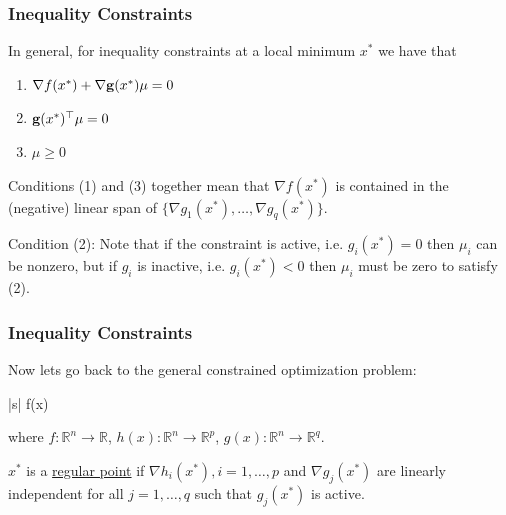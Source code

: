 \documentclass{beamer}
\begin{document}
\begin{frame}\frametitle{Inequality Constraints}
	In general, for inequality constraints at a local minimum $x^{\ast}$ we have that
	\begin{enumerate}
	\item $\nabla f(x^{\ast}) + \nabla \mathbf{g}(x^{\ast})\mu = 0$
	\item $\mathbf{g}(x^{\ast})^\top  \mu = 0$
	\item $\mu \geq 0$
	\end{enumerate}
	
	\vfill

	Conditions (1) and (3) together mean that $\nabla f(x^{\ast})$ is contained in the (negative) linear span of $\{\nabla g_1(x^{\ast}),\ldots,\nabla g_{q}(x^{\ast}) \}$.
	
	\vfill
	
	Condition (2): Note that if the constraint is active, i.e. $g_i(x^{\ast}) = 0$ then $\mu_i$ can be nonzero, but if $g_i$ is inactive, i.e. $g_i(x^{\ast}) < 0$ then $\mu_i$ must be zero to satisfy (2).		
\end{frame}

\begin{frame}\frametitle{Inequality Constraints}
	Now lets go back to the general constrained optimization problem:
	\begin{mini*}|s|
		{}{f(x)}{}{}
	\end{mini*}	
	where 
	$f:\mathbb{R}^n\to \mathbb{R}$,
	$h(x):\mathbb{R}^n\to\mathbb{R}^p$,
	$g(x):\mathbb{R}^n\to\mathbb{R}^q$.
	
	\begin{definition}
	$x^{\ast}$ is a \underline{regular point} if $\nabla h_i(x^{\ast}), i = 1, \ldots, p$ and $\nabla g_j(x^{\ast})$ are linearly independent for all $j=1,\dots, q$ such that $g_j(x^{\ast})$ is active.		
	\end{definition}
\end{frame}
	
\end{document}
